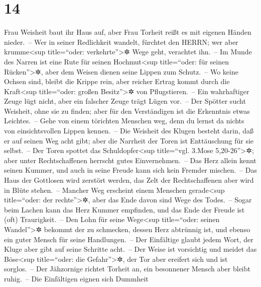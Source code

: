 \hypertarget{section-13}{%
\section{14}\label{section-13}}

Frau Weisheit baut ihr Haus auf, aber Frau Torheit reißt
es mit eigenen Händen nieder.~-- Wer in seiner Redlichkeit
wandelt, fürchtet den HERRN; wer aber krumme\textless sup title=``oder:
verkehrte''\textgreater✲ Wege geht, verachtet ihn.~-- Im
Munde des Narren ist eine Rute für seinen Hochmut\textless sup
title=``oder: für seinen Rücken''\textgreater✲, aber dem Weisen dienen
seine Lippen zum Schutz.~-- Wo keine Ochsen sind, bleibt
die Krippe rein, aber reicher Ertrag kommt durch die Kraft\textless sup
title=``oder: großen Besitz''\textgreater✲ von Pflugstieren.~--
Ein wahrhaftiger Zeuge lügt nicht, aber ein falscher Zeuge
trägt Lügen vor.~-- Der Spötter sucht Weisheit, ohne sie
zu finden; aber für den Verständigen ist die Erkenntnis etwas
Leichtes.~-- Gehe von einem törichten Menschen weg, denn
du lernst da nichts von einsichtsvollen Lippen kennen.~--
Die Weisheit des Klugen besteht darin, daß er auf seinen
Weg acht gibt; aber die Narrheit der Toren ist Enttäuschung für sie
selbst.~-- Der Toren spottet das Schuldopfer\textless sup
title=``vgl. 3.Mose 5,20-26''\textgreater✲; aber unter Rechtschaffenen
herrscht gutes Einvernehmen.~-- Das Herz allein kennt
seinen Kummer, und auch in seine Freude kann sich kein Fremder
mischen.~-- Das Haus der Gottlosen wird zerstört werden,
das Zelt der Rechtschaffenen aber wird in Blüte stehen.~--
Mancher Weg erscheint einem Menschen gerade\textless sup
title=``oder: der rechte''\textgreater✲, aber das Ende davon sind Wege
des Todes.~-- Sogar beim Lachen kann das Herz Kummer
empfinden, und das Ende der Freude ist (oft) Traurigkeit.~--
Den Lohn für seine Wege\textless sup title=``oder: seinen
Wandel''\textgreater✲ bekommt der zu schmecken, dessen Herz abtrünnig
ist, und ebenso ein guter Mensch für seine Handlungen.~--
Der Einfältige glaubt jedem Wort, der Kluge aber gibt auf
seine Schritte acht.~-- Der Weise ist vorsichtig und
meidet das Böse\textless sup title=``oder: die Gefahr''\textgreater✲,
der Tor aber ereifert sich und ist sorglos.~-- Der
Jähzornige richtet Torheit an, ein besonnener Mensch aber bleibt
ruhig.~-- Die Einfältigen eignen sich Dummheit
